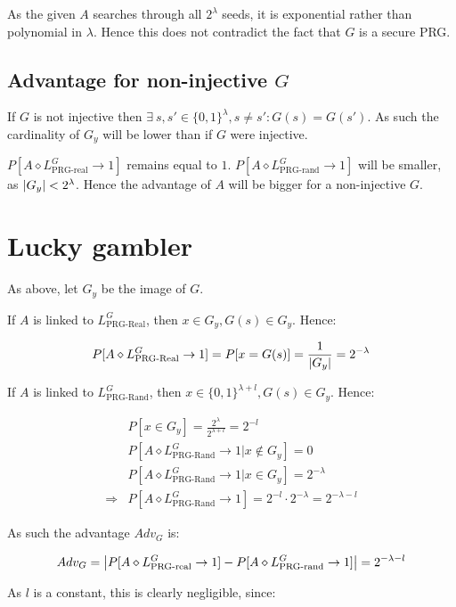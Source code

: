 \documentclass[a4paper]{scrreprt}
\DeclarePairedDelimiter\abs{\lvert}{\rvert}
\begin{document}
As the given $A$ searches through all $2^\lambda$ seeds, it is exponential
rather than polynomial in $\lambda$. Hence this does not contradict the fact
that $G$ is a secure PRG.

\subsection{Advantage for non-injective $G$}

If $G$ is not injective then $\exists\ s, s' \in \{0, 1\}^\lambda, s \neq s':
G(s) = G(s')$. As such the cardinality of $G_y$ will be lower than if $G$ were
injective.

$P[A \diamond L^G_{\text{PRG-real}} \rightarrow 1]$ remains equal to $1$. $P[A
\diamond L^G_{\text{PRG-rand}} \rightarrow 1]$ will be smaller, as $\abs{G_y} <
2^\lambda$. Hence the advantage of $A$ will be bigger for a non-injective $G$.

\section{Lucky gambler}

As above, let $G_y$ be the image of $G$.

If $A$ is linked to $L^G_{\text{PRG-Real}}$, then $x \in G_y, G(s) \in G_y$. Hence:

\[
	P[A \diamond L^G_{\text{PRG-Real}} \rightarrow 1] = P[x = G(s)] = \frac{1}{\abs{G_y}} = 2^{-\lambda}
\]

If $A$ is linked to $L^G_{\text{PRG-Rand}}$, then $x \in \{0, 1\}^{\lambda + l}, G(s) \in G_y$. Hence:

\begin{align*}
	& P[x \in G_y] = \frac{2^\lambda}{2^{\lambda + l}} = 2^{-l} \\
	& P[A \diamond L^G_{\text{PRG-Rand}} \rightarrow 1 | x \not \in G_y] = 0 \\
	& P[A \diamond L^G_{\text{PRG-Rand}} \rightarrow 1 | x \in G_y] = 2^{-\lambda} \\
	\Rightarrow & P[A \diamond L^G_{\text{PRG-Rand}} \rightarrow 1] = 2^{-l} \cdot 2^{-\lambda} = 2^{-\lambda - l}
\end{align*}

As such the advantage $Adv_G$ is:

\[
	Adv_G = \abs*{P[A \diamond L^G_{\text{PRG-real}} \rightarrow 1] - P[A \diamond L^G_{\text{PRG-rand}} \rightarrow 1]} = 2^{-\lambda - l}
\]

As $l$ is a constant, this is clearly negligible, since:
\end{document}
